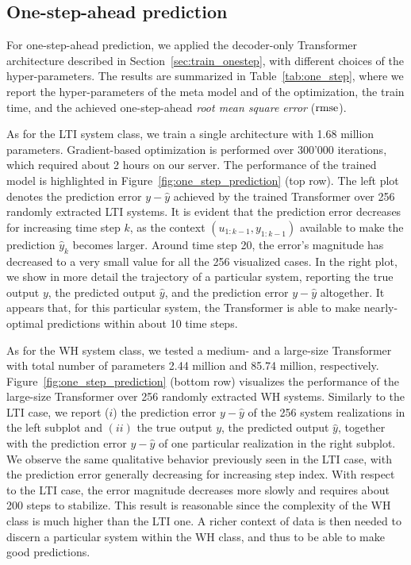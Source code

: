 \documentclass{article}
\begin{document}
\subsection{One-step-ahead prediction}
For one-step-ahead prediction, we applied the decoder-only Transformer architecture
described in Section~\ref{sec:train_onestep}, with different choices of the hyper-parameters.
The results are summarized in Table~\ref{tab:one_step}, where we report the hyper-parameters of the meta model and of the optimization, the train time, and the achieved one-step-ahead \emph{root mean square error} ($\rm rmse$).

As for the LTI system class, we train a single architecture with 1.68 million parameters.
Gradient-based optimization is performed over 300'000 iterations, which required about 2 hours on our server.
The performance of the trained model is highlighted in Figure~\ref{fig:one_step_prediction} (top row). The left plot denotes the prediction error $y - \hat y$ achieved by the trained Transformer over 256 randomly extracted LTI systems.
It is evident that the prediction error decreases for increasing time step $k$, as the context 
 $(u_{1:k-1}, y_{1:k-1})$ available to make the prediction  $\hat y_k$   becomes larger.
Around time step 20, the error's magnitude has decreased to a very small value for all the 256 visualized cases. In the right plot, we show in more detail the trajectory of a particular system, reporting the true output $y$, the predicted output $\hat y$, and the prediction error $y - \hat y$ altogether. It appears that, for this particular system, the Transformer is able to make nearly-optimal predictions within about 10 time steps.

As for the WH system class, we tested a medium- and a large-size Transformer with total number of parameters  2.44 million  and 85.74 million, respectively.
Figure~\ref{fig:one_step_prediction} (bottom row) visualizes the performance of the large-size Transformer over 256 randomly extracted
WH systems.
Similarly to the LTI case, we report ($i$) the prediction error $y - \hat y$ of the 256 system realizations in the left subplot and $(ii)$ the true output $y$, the predicted output $\hat y$, together with the prediction error 
$y - \hat y$ of one particular realization in the right subplot. We observe the same qualitative behavior previously seen in the LTI case, with the 
prediction error generally decreasing for increasing step index. 
With respect to the LTI case, the error magnitude decreases more slowly and requires about 200 steps to stabilize. This result is reasonable since  the complexity of the WH class is much higher than the LTI one. A richer context of data is then needed to discern a particular system within the WH class, and thus to be able to make good predictions.
\end{document}
